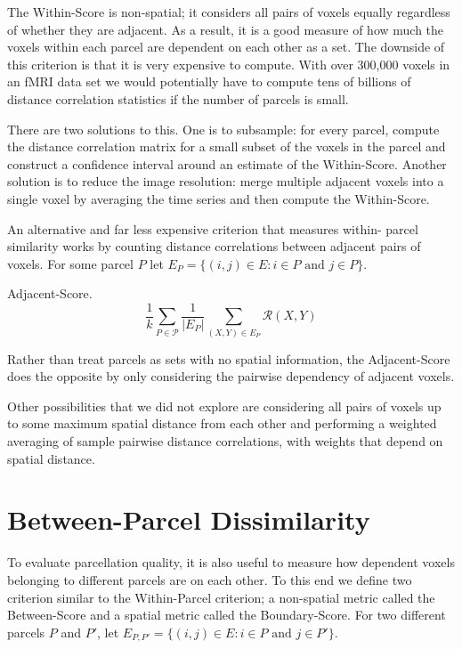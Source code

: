 The Within-Score is non-spatial; it considers all pairs of voxels
equally regardless of whether they are adjacent. As a result, it is a
good measure of how much the voxels within each parcel are dependent on
each other as a set. The downside of this criterion is that it is very
expensive to compute. With over 300,000 voxels in an fMRI data set we
would potentially have to compute tens of billions of distance
correlation statistics if the number of parcels is small.

There are two solutions to this. One is to subsample: for every parcel,
compute the distance correlation matrix for a small subset of the voxels
in the parcel and construct a confidence interval around an estimate of
the Within-Score. Another solution is to reduce the image resolution:
merge multiple adjacent voxels into a single voxel by averaging the time
series and then compute the Within-Score.

An alternative and far less expensive criterion that measures within-
parcel similarity works by counting distance correlations between
adjacent pairs of voxels. For some parcel $P$ let
$E_P = \{ (i,j) \in E : i \in P \text{ and } j \in P \}$.

\begin{definition} \label{adjacent-score}
Adjacent-Score.
\[ \frac{1}{k} \sum_{P \in \mathcal{P}}
   \frac{1}{|E_P|} \sum_{(X,Y) \in E_P} \mathcal{R}(X,Y)
\]
\end{definition}

Rather than treat parcels as sets with no spatial information, the
Adjacent-Score does the opposite by only considering the pairwise
dependency of adjacent voxels.

Other possibilities that we did not explore are considering all pairs
of voxels up to some maximum spatial distance from each other and
performing a weighted averaging of sample pairwise distance
correlations, with weights that depend on spatial distance.

\section{Between-Parcel Dissimilarity}

To evaluate parcellation quality, it is also useful to measure how
dependent voxels belonging to different parcels are on each other. To
this end we define two criterion similar to the Within-Parcel criterion;
a non-spatial metric called the Between-Score and a spatial metric
called the Boundary-Score. For two different parcels $P$ and $P'$, let
$E_{P,P'} = \{ (i,j) \in E : i \in P \text{ and } j \in P' \}$.

